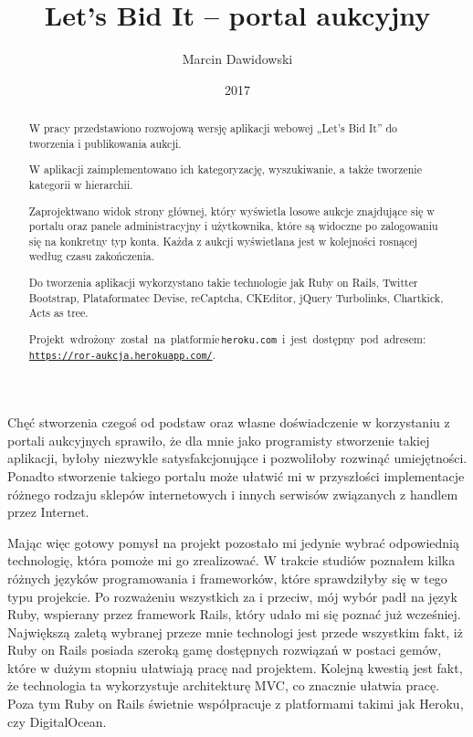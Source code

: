 \documentclass[brudnopis]{xmgr}
\author   {Marcin Dawidowski}
\title    {Let’s Bid It – portal aukcyjny}
\date     {2017}
\begin{document}
\begin{abstract}
  W pracy przedstawiono rozwojową wersję aplikacji webowej „Let's Bid It” do tworzenia i publikowania aukcji.
  
  W aplikacji zaimplementowano ich kategoryzację, wyszukiwanie, a także tworzenie kategorii w hierarchii.

  Zaprojektwano widok strony głównej, który wyświetla losowe aukcje znajdujące się w portalu oraz panele administracyjny i użytkownika, które są widoczne po zalogowaniu się na konkretny typ konta. Każda z aukcji wyświetlana jest w kolejności rosnącej według czasu zakończenia.

  Do tworzenia aplikacji wykorzystano takie technologie jak Ruby on Rails, Twitter Bootstrap, Plataformatec Devise, reCaptcha, CKEditor, jQuery Turbolinks, Chartkick, Acts as tree.

\mbox{Projekt wdrożony został na platformie\, \\\texttt{heroku.com} i jest dostępny pod adresem:} \\\texttt{\url{https://ror-aukcja.herokuapp.com/}}.


\end{abstract}


\maketitle

\introduction

Chęć stworzenia czegoś od podstaw oraz własne doświadczenie w korzystaniu z portali aukcyjnych sprawiło, że dla mnie jako programisty stworzenie takiej aplikacji, byłoby niezwykle satysfakcjonujące i pozwoliłoby rozwinąć umiejętności. Ponadto stworzenie takiego portalu może ułatwić mi w przyszłości implementacje różnego rodzaju sklepów internetowych i innych serwisów związanych z handlem przez Internet.

Mając więc gotowy pomysł na projekt pozostało mi jedynie wybrać odpowiednią technologię, która pomoże mi go zrealizować. W trakcie studiów poznałem kilka różnych języków programowania i frameworków, które sprawdziłyby się w tego typu projekcie. Po rozważeniu wszystkich za i przeciw, mój wybór padł na język Ruby, wspierany przez framework Rails, który udało mi się poznać już wcześniej. Największą zaletą wybranej przeze mnie technologi jest przede wszystkim fakt, iż Ruby on Rails posiada szeroką gamę dostępnych rozwiązań w postaci gemów, które w dużym stopniu ułatwiają pracę nad projektem. Kolejną kwestią jest fakt, że technologia  ta wykorzystuje architekturę MVC, co znacznie ułatwia pracę. Poza tym Ruby on Rails świetnie współpracuje z platformami takimi jak Heroku, czy DigitalOcean. 
\end{document}
